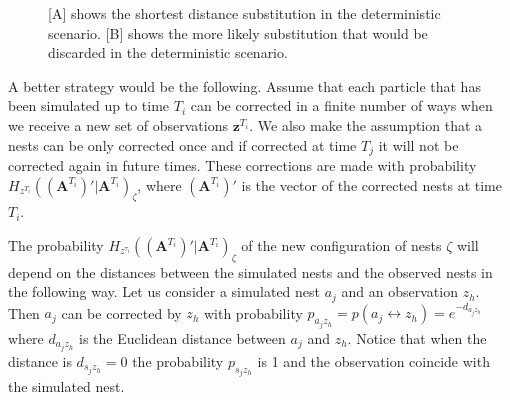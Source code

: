 \documentclass{article}
\renewcommand{\vec}[1]{\mathbf{#1}}
\begin{document}
\begin{figure}
\centering
\caption{[A] shows the shortest distance substitution in the deterministic scenario. [B] shows the more likely substitution that would be discarded in the deterministic scenario.}
\label{fig:1}
\end{figure}

A better strategy would be the following. Assume that each particle that has been simulated up to time $T_i$ can be corrected in a finite number of ways when we receive a new set of observations $\vec{z}^{T_i}$. We also make the assumption that a nests can be only corrected once and if corrected at time $T_j$ it will not be corrected again in future times. These corrections are made with probability $H_{z^{T_i}}((\vec{A}^{T_i})' | \vec{A}^{T_i})_{\zeta}$, where $(\vec{A}^{T_i})'$ is the vector of the corrected nests at time $T_i$.

The probability $H_{z^{\tau_i}}((\vec{A}^{T_i})' | \vec{A}^{T_i})_{\zeta}$ of the new configuration of nests $\zeta$ will depend on the distances between the simulated nests and the observed nests in the following way. Let us consider a simulated nest $a_j$ and an observation $z_h$. Then $a_j$ can be corrected by $z_h$ with probability $p_{a_j z_h} = p(a_j \leftrightarrow z_h) = e^{-d_{a_j z_h}}$ where $d_{a_j z_h}$ is the Euclidean distance between $a_j$ and $z_h$. Notice that when the distance is $d_{s_j z_h} = 0$ the probability $p_{s_j z_h}$ is 1 and the observation coincide with the simulated nest. 
\end{document}

